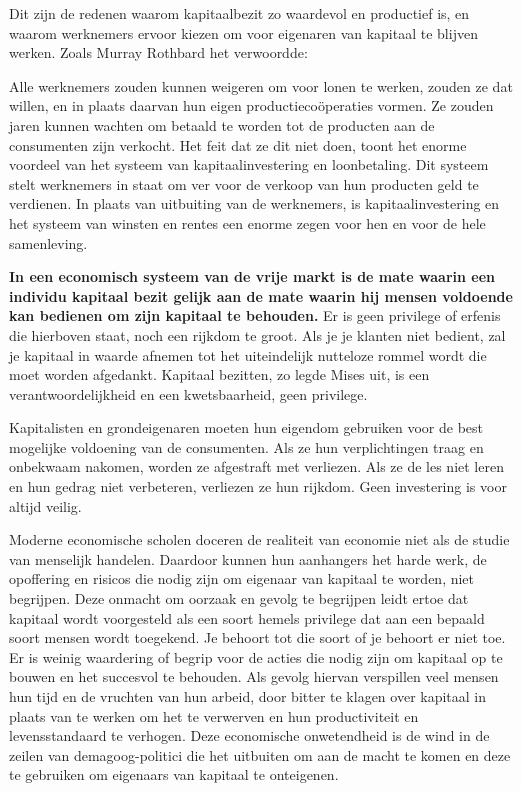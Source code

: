 Dit zijn de redenen waarom kapitaalbezit zo waardevol en productief is, en waarom werknemers ervoor kiezen om voor eigenaren van kapitaal te blijven werken. Zoals Murray Rothbard het verwoordde:

\begin{blockquotebox}
    Alle werknemers zouden kunnen weigeren om voor lonen te werken, zouden ze dat willen, en in plaats daarvan hun eigen productiecoöperaties vormen. Ze zouden jaren kunnen wachten om betaald te worden tot de producten aan de consumenten zijn verkocht. Het feit dat ze dit niet doen, toont het enorme voordeel van het systeem van kapitaalinvestering en loonbetaling. Dit systeem stelt werknemers in staat om ver voor de verkoop van hun producten geld te verdienen. In plaats van uitbuiting van de werknemers, is kapitaalinvestering en het systeem van winsten en rentes een enorme zegen voor hen en voor de hele samenleving. \footnotemark
\end{blockquotebox}

\textbf{In een economisch systeem van de vrije markt is de mate waarin een individu kapitaal bezit gelijk aan de mate waarin hij mensen voldoende kan bedienen om zijn kapitaal te behouden.} Er is geen privilege of erfenis die hierboven staat, noch een rijkdom te groot. Als je je klanten niet bedient, zal je kapitaal in waarde afnemen tot het uiteindelijk nutteloze rommel wordt die moet worden afgedankt. Kapitaal bezitten, zo legde Mises uit, is een verantwoordelijkheid en een kwetsbaarheid, geen privilege.

\begin{blockquotebox}
    Kapitalisten en grondeigenaren moeten hun eigendom gebruiken voor de best mogelijke voldoening van de consumenten. Als ze hun verplichtingen traag en onbekwaam nakomen, worden ze afgestraft met verliezen. Als ze de les niet leren en hun gedrag niet verbeteren, verliezen ze hun rijkdom. Geen investering is voor altijd veilig. \footnotemark
\end{blockquotebox}

Moderne economische scholen doceren de realiteit van economie niet als de studie van menselijk handelen. Daardoor kunnen hun aanhangers het harde werk, de opoffering en risico\textquotesingle s die nodig zijn om eigenaar van kapitaal te worden, niet begrijpen. Deze onmacht om oorzaak en gevolg te begrijpen leidt ertoe dat kapitaal wordt voorgesteld als een soort hemels privilege dat aan een bepaald soort mensen wordt toegekend. Je behoort tot die soort of je behoort er niet toe. Er is weinig waardering of begrip voor de acties die nodig zijn om kapitaal op te bouwen en het succesvol te behouden. Als gevolg hiervan verspillen veel mensen hun tijd en de vruchten van hun arbeid, door bitter te klagen over kapitaal in plaats van te werken om het te verwerven en hun productiviteit en levensstandaard te verhogen. Deze economische onwetendheid is de wind in de zeilen van demagoog-politici die het uitbuiten om aan de macht te komen en deze te gebruiken om eigenaars van kapitaal te onteigenen.

